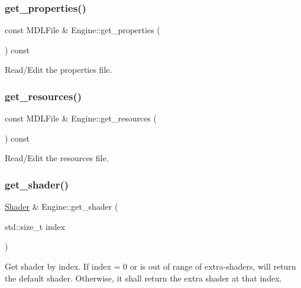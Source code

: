 \subsubsection{\texorpdfstring{get\+\_\+properties()}{get\_properties()}}
{\footnotesize\ttfamily const M\+D\+L\+File \& Engine\+::get\+\_\+properties (\begin{DoxyParamCaption}{ }\end{DoxyParamCaption}) const}

Read/\+Edit the properties file. \mbox{\label{class_engine_af9664f90857d014e7bf5245380a1519a}} 
\subsubsection{\texorpdfstring{get\+\_\+resources()}{get\_resources()}}
{\footnotesize\ttfamily const M\+D\+L\+File \& Engine\+::get\+\_\+resources (\begin{DoxyParamCaption}{ }\end{DoxyParamCaption}) const}

Read/\+Edit the resources file. \mbox{\label{class_engine_af92650e3ce3cabf7e527c92ae4917702}} 
\subsubsection{\texorpdfstring{get\+\_\+shader()}{get\_shader()}}
{\footnotesize\ttfamily \mbox{\hyperlink{class_shader}{Shader}} \& Engine\+::get\+\_\+shader (\begin{DoxyParamCaption}\item[{std\+::size\+\_\+t}]{index }\end{DoxyParamCaption})}

Get shader by index. If index = 0 or is out of range of extra-\/shaders, will return the default shader. Otherwise, it shall return the extra shader at that index. \mbox{\label{class_engine_a457c2c3adbc7baa8b2903b139882fc79}} 
